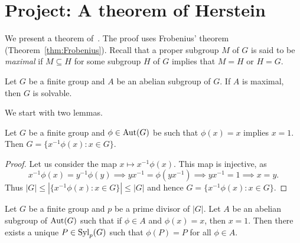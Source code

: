 \section{Project: A theorem of Herstein}

We present 
a theorem of~\cite{MR93542}. The proof uses Frobenius' theorem (Theorem~\ref{thm:Frobenius}). Recall that 
a proper subgroup $M$ of $G$ is said to be \emph{maximal} 
if $M\subseteq H$ for some subgroup $H$ of $G$ 
implies that $M=H$ or $H=G$. 

\begin{theorem}[Herstein]
\label{thm:Herstein}
    Let $G$ be a finite group and $A$ be an abelian
    subgroup of $G$. If $A$ is maximal, then
    $G$ is solvable. 
\end{theorem}

We start with two lemmas.

\begin{lemma}
\label{lem:phi}
    Let $G$ be a finite group and $\phi\in\operatorname{Aut}(G)$ be such that
    $\phi(x)=x$ implies $x=1$. Then $G=\{x^{-1}\phi(x):x\in G\}$. 
\end{lemma}

\begin{proof}
    Let us consider the map 
    $x\mapsto x^{-1}\phi(x)$. This map is injective, as 
    \[
    x^{-1}\phi(x)=y^{-1}\phi(y)\implies 
    yx^{-1}=\phi(yx^{-1})\implies yx^{-1}=1\implies x=y.
    \]
    Thus $|G|\leq |\{x^{-1}\phi(x):x\in G\}|\leq |G|$ and hence
    $G=\{x^{-1}\phi(x):x\in G\}$. 
\end{proof}

\begin{lemma}
    Let $G$ be a finite group and $p$ be a prime divisor of $|G|$. Let $A$ be an abelian
    subgroup of $\operatorname{Aut}(G)$ such that if $\phi\in A$ and 
    $\phi(x)=x$, then $x=1$. Then there 
    exists a unique $P\in\mathrm{Syl}_p(G)$
    such that $\phi(P)=P$ for all $\phi\in A$. 
\end{lemma}

